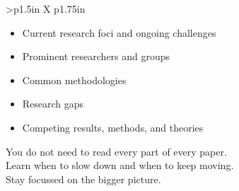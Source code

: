 \documentclass[8pt]{extarticle}
\begin{document}
\begin{tabularx}{\linewidth}{>{\bfseries}p{1.5in} X p{1.75in}}
\begin{minipage}[t]{\linewidth}
\begin{itemize}[nosep]
                                        \item Current research foci and ongoing challenges
                                        \item Prominent researchers and groups
                                        \item Common methodologies
                                        \item Research gaps
                                        \item Competing results, methods, and theories
                                    \end{itemize}
                                    You do not need to read every part of every paper. \\
                                    Learn when to slow down and when to keep moving. \\
                                    Stay focussed on the bigger picture. \\
                                    \end{minipage}


\end{tabularx}
\end{document}
